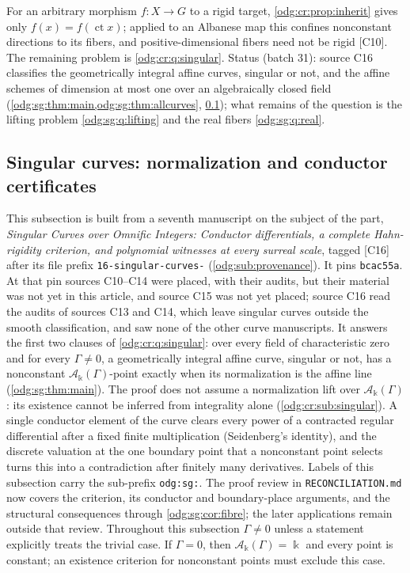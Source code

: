 \documentclass[11pt,oneside]{article}
\numberwithin{equation}{section}
\theoremstyle{definition}
\theoremstyle{remark}
\newcommand{\ct}{\operatorname{ct}}
\newcommand{\src}[1]{\textup{\textsf{\small[#1]}}}
\newcommand{\fn}[1]{\nolinkurl{#1}}
\newcommand{\crA}{\mathcal A_\Bbbk(\Gamma)}
\begin{document}
For an arbitrary
morphism $f:X\to G$ to a rigid target, \cref{odg:cr:prop:inherit} gives only
$f(x)=f(\ct x)$; applied to an Albanese map this confines nonconstant directions to
its fibers, and positive-dimensional fibers need not be rigid \src{C10}. The
remaining problem is \cref{odg:cr:q:singular}. Status (batch 31): source C16 classifies the
geometrically integral affine curves, singular or not, and the affine schemes of dimension
at most one over an algebraically closed field (\cref{odg:sg:thm:main,odg:sg:thm:allcurves},
\cref{odg:sg:sub:singular}); what remains of the question is the lifting problem
\cref{odg:sg:q:lifting} and the real fibers \cref{odg:sg:q:real}.

\subsection{Singular curves: normalization and conductor certificates}\label{odg:sg:sub:singular}

This subsection is built from a seventh manuscript on the subject of the part,
\emph{Singular Curves over Omnific Integers: Conductor differentials, a complete
Hahn-rigidity criterion, and polynomial witnesses at every surreal scale}, tagged
\src{C16} after its file prefix \fn{16-singular-curves-} (\cref{odg:sub:provenance}).
It pins \texttt{bcac55a}. At that pin sources C10--C14 were placed, with their audits,
but their material was not yet in this article, and source C15 was not yet placed; source
C16 read the audits of sources C13 and C14, which leave singular curves outside the
smooth classification, and saw none of the other curve manuscripts. It answers the first
two clauses of \cref{odg:cr:q:singular}: over every field of characteristic zero and for
every $\Gamma\ne0$, a geometrically integral affine curve, singular or not, has a
nonconstant $\crA$-point exactly when its normalization is the affine line
(\cref{odg:sg:thm:main}). The proof does not assume a normalization lift
over $\crA$: its existence cannot be inferred from integrality alone
(\cref{odg:cr:sub:singular}). A single
conductor element of the curve clears every power of a contracted regular differential
after a fixed finite multiplication (Seidenberg's identity), and the discrete valuation at
the one boundary point that a nonconstant point selects turns this into a contradiction
after finitely many derivatives. Labels of this subsection carry the sub-prefix
\fn{odg:sg:}. The proof review in \fn{RECONCILIATION.md} now covers
the criterion, its conductor and boundary-place arguments, and the structural
consequences through \cref{odg:sg:cor:fibre}; the later applications remain
outside that review. Throughout this subsection $\Gamma\ne0$ unless a
statement explicitly treats the trivial case. If $\Gamma=0$, then
$\crA=\Bbbk$ and every point is constant; an existence criterion for
nonconstant points must exclude this case.
\end{document}
